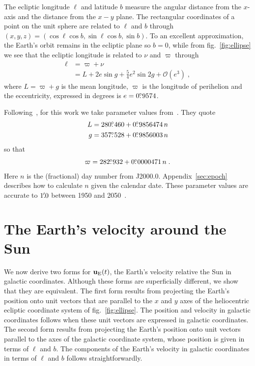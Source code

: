 \documentclass[preprintnumbers,a4paper,twocolumn,floats,nofootinbib,superscriptaddress,aps,prd]{revtex4-1}
\newcommand\fdg{\hbox{$.\!\!^\circ$}}
\newcommand\farcm{\hbox{$.\!\!^{\prime}$}}
\begin{document}
The ecliptic longitude $\ell$ and latitude $b$ measure the angular distance from the $x$-axis and the distance from the $x-y$ plane. The rectangular coordinates of a point on the unit sphere are related to $\ell$ and $b$ through $(x,y,z)=(\cos \ell \cos b, \sin \ell \cos b, \sin b)$. To an excellent approximation, the Earth's orbit remains in the ecliptic plane so $b=0$, while from fig.~\ref{fig:ellipse} we see that the ecliptic longitude is related to $\nu$ and $\varpi$ through
\begin{align}
\ell&=\varpi+\nu\\
&= L+2e \sin g+\frac{5}{4}e^2 \sin 2g+\mathcal{O}(e^3)\;,
\end{align}
where $L=\varpi+g$ is the mean longitude, $\varpi$ is the longitude of perihelion and the eccentricity, expressed in degrees is $e=0\fdg9574$.

Following~\cite{Lewin:1995rx}, for this work we take parameter values from~\cite{AA2014}. They quote 
\begin{align}
L&=280\fdg460+0\fdg9856474 \,n\\
g&=357\fdg528+0\fdg9856003\,n
\end{align} 
so that 
\begin{equation}
\varpi=282\fdg932+0\fdg0000471\,n\;.
\end{equation}
Here $n$ is the (fractional) day number from J2000.0. Appendix~\ref{sec:epoch} describes how to calculate $n$ given the calendar date. These parameter values are accurate to $1\farcm0$ between 1950 and 2050~\cite{AA2014}.

\section{The Earth's velocity around the Sun}
\label{section:Eu}

We now derive two forms for $\mathbf{u}_{\rm{E}}(t)$, the Earth's velocity relative the Sun in galactic coordinates. Although these forms are superficially different, we show that they are equivalent. The first form results from projecting the Earth's position onto unit vectors that are parallel to the $x$ and $y$ axes of the heliocentric ecliptic coordinate system of fig.~\ref{fig:ellipse}. The position and velocity in galactic coordinates follows when these unit vectors are expressed in galactic coordinates. The second form results from projecting the Earth's position onto unit vectors parallel to the axes of the galactic coordinate system, whose position is given in terms of $\ell$ and $b$. The components of the Earth's velocity in galactic coordinates in terms of $\ell$ and $b$ follows straightforwardly.
\end{document}
